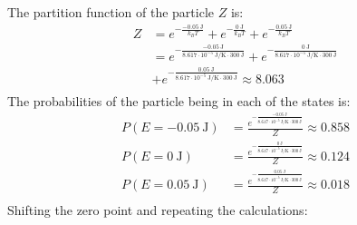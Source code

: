 \documentclass{article}
\begin{document}
The partition function of the particle $Z$ is:
\begin{equation}
    \begin{split}
        Z & = e^{-\frac{-0.05~\unit{\joule}}{k_BT}} + e^{-\frac{0~\unit{\joule}}{k_BT}} + e^{-\frac{0.05~\unit{\joule}}{k_BT}} \\
        & = e^{-\frac{-0.05~\unit{\joule}}{8.617 \cdot 10^{-5}~\unit{\joule\per\kelvin} \cdot 300~\unit{\joule}}} + e^{-\frac{0~\unit{\joule}}{8.617 \cdot 10^{-5}~\unit{\joule\per\kelvin} \cdot 300~\unit{\joule}}} \\
        & + e^{-\frac{0.05~\unit{\joule}}{8.617 \cdot 10^{-5}~\unit{\joule\per\kelvin} \cdot 300~\unit{\joule}}} \approx 8.063 \\
    \end{split}
\end{equation}
The probabilities of the particle being in each of the states is:
\begin{equation}
    \begin{split}
        P\left(E = -0.05~\unit{\joule}\right) & = \frac{e^{-\frac{-0.05~\unit{\joule}}{8.617 \cdot 10^{-5}~\unit{\joule\per\kelvin} \cdot 300~\unit{\joule}}}}{Z} \approx 0.858 \\
        P\left(E = 0~\unit{\joule}\right) & = \frac{e^{-\frac{0~\unit{\joule}}{8.617 \cdot 10^{-5}~\unit{\joule\per\kelvin} \cdot 300~\unit{\joule}}}}{Z} \approx 0.124 \\
        P\left(E = 0.05~\unit{\joule}\right) & = \frac{e^{-\frac{0.05~\unit{\joule}}{8.617 \cdot 10^{-5}~\unit{\joule\per\kelvin} \cdot 300~\unit{\joule}}}}{Z} \approx 0.018 \\
    \end{split}
\end{equation}
Shifting the zero point and repeating the calculations:
\end{document}
